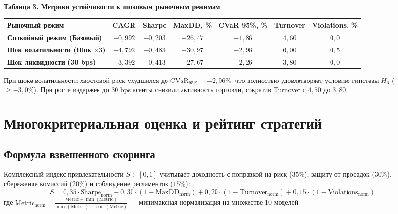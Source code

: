 \documentclass[11pt,a4paper]{article}
\begin{document}
\vspace{0.5em}
\noindent\textbf{Таблица 3. Метрики устойчивости к шоковым рыночным режимам}
\vspace{0.3em}

{\small \setlength{\tabcolsep}{5pt} \renewcommand{\arraystretch}{1.15}
\noindent\begin{tabularx}{\textwidth}{>{\raggedright\arraybackslash}X c c c c c c}
\toprule
\textbf{Рыночный режим} & \textbf{CAGR} & \textbf{Sharpe} & \textbf{MaxDD, \%} & \textbf{CVaR 95\%, \%} & \textbf{Turnover} & \textbf{Violations, \%} \\
\midrule
\textbf{Спокойный режим (Базовый)} & $-0{,}992$ & $-0{,}203$ & $-26{,}47$ & $-1{,}86$ & $4{,}60$ & $0{,}0$ \\
\textbf{Шок волатильности (Шок $\times 3$)} & $-4{,}792$ & $-0{,}483$ & $-30{,}97$ & $-2{,}96$ & $6{,}00$ & $0{,}5$ \\
\textbf{Шок ликвидности (30 bps)} & $-3{,}392$ & $-0{,}413$ & $-27{,}67$ & $-2{,}26$ & $3{,}80$ & $0{,}0$ \\
\bottomrule
\end{tabularx}}

\vspace{0.4em}
При шоке волатильности хвостовой риск ухудшился до $\text{CVaR}_{95\%} = -2{,}96\%$, что полностью удовлетворяет условию гипотезы $H_3$ ($\ge -3{,}0\%$). При росте издержек до 30 bps агенты снизили активность торговли, сократив Turnover с $4{,}60$ до $3{,}80$.

\section{Многокритериальная оценка и рейтинг стратегий}

\subsection{Формула взвешенного скоринга}

Комплексный индекс привлекательности $S \in [0, 1]$ учитывает доходность с поправкой на риск ($35\%$), защиту от просадок ($30\%$), сбережение комиссий ($20\%$) и соблюдение регламентов ($15\%$):
$$S = 0{,}35 \cdot \text{Sharpe}_{\text{norm}} + 0{,}30 \cdot (1 - \text{MaxDD}_{\text{norm}}) + 0{,}20 \cdot (1 - \text{Turnover}_{\text{norm}}) + 0{,}15 \cdot (1 - \text{Violations}_{\text{norm}})$$
где $\text{Metric}_{\text{norm}} = \frac{\text{Metric} - \min(\text{Metric})}{\max(\text{Metric}) - \min(\text{Metric})}$ --- минимаксная нормализация на множестве 10 моделей.
\end{document}
